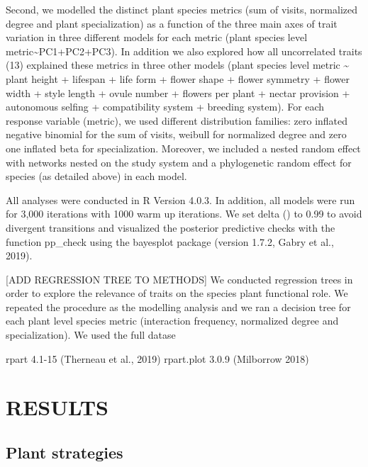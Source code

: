 \documentclass[11pt,a4paper,]{article}
\begin{document}
Second, we modelled the distinct plant species metrics (sum of visits,
normalized degree and plant specialization) as a function of the three
main axes of trait variation in three different models for each metric
(plant species level metric\textasciitilde{}PC1+PC2+PC3). In addition we
also explored how all uncorrelated traits (13) explained these metrics
in three other models (plant species level metric \textasciitilde{}
plant height + lifespan + life form + flower shape + flower symmetry +
flower width + style length + ovule number + flowers per plant + nectar
provision + autonomous selfing + compatibility system + breeding
system). For each response variable (metric), we used different
distribution families: zero inflated negative binomial for the sum of
visits, weibull for normalized degree and zero one inflated beta for
specialization. Moreover, we included a nested random effect with
networks nested on the study system and a phylogenetic random effect for
species (as detailed above) in each model.

All analyses were conducted in R Version 4.0.3. In addition, all models
were run for 3,000 iterations with 1000 warm up iterations. We set delta
() to 0.99 to avoid divergent transitions and visualized the posterior
predictive checks with the function pp\_check using the bayesplot
package (version 1.7.2, Gabry et al., 2019).

{[}ADD REGRESSION TREE TO METHODS{]} We conducted regression trees in
order to explore the relevance of traits on the species plant functional
role. We repeated the procedure as the modelling analysis and we ran a
decision tree for each plant level species metric (interaction
frequency, normalized degree and specialization). We used the full
datase

rpart 4.1-15 (Therneau et al., 2019) rpart.plot 3.0.9 (Milborrow 2018)

\section{RESULTS}\label{results}

\subsection{Plant strategies}\label{plant-strategies-1}
\end{document}
